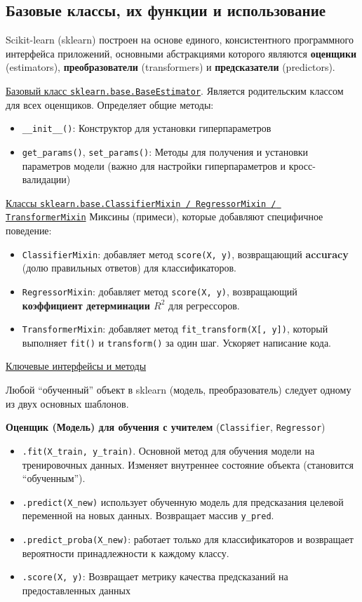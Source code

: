 \subsection{Базовые классы, их функции и использование}

Scikit-learn (sklearn) построен на основе единого, консистентного программного интерфейса приложений, основными
абстракциями которого являются \textbf{оценщики} (estimators), \textbf{преобразователи} (transformers) и
\textbf{предсказатели} (predictors).

\underline{Базовый класс \texttt{sklearn.base.BaseEstimator}}.
Является родительским классом для всех оценщиков.
Определяет общие методы:
\begin{itemize}
    \item \texttt{\_\_init\_\_()}: Конструктор для установки гиперпараметров
    \item \texttt{get\_params()}, \texttt{set\_params()}: Методы для получения и установки параметров модели
    (важно для настройки гиперпараметров и кросс-валидации)
\end{itemize}

\underline{Классы \texttt{sklearn.base.ClassifierMixin / RegressorMixin / TransformerMixin}}
Миксины (примеси), которые добавляют специфичное поведение:
\begin{itemize}
    \item \texttt{ClassifierMixin}: добавляет метод \texttt{score(X, y)}, возвращающий
    \textbf{accuracy} (долю правильных ответов) для классификаторов.
    \item \texttt{RegressorMixin}: добавляет метод \texttt{score(X, y)}, возвращающий
    \textbf{коэффициент детерминации $R^2$} для регрессоров.
    \item \texttt{TransformerMixin}: добавляет метод \texttt{fit\_transform(X[, y])}, который выполняет
    \texttt{fit()} и \texttt{transform()} за один шаг.
    Ускоряет написание кода.
\end{itemize}

\underline{Ключевые интерфейсы и методы}

Любой ``обученный'' объект в sklearn (модель, преобразователь) следует одному из двух основных шаблонов.

\textbf{Оценщик (Модель) для обучения с учителем} (\texttt{Classifier}, \texttt{Regressor})
\begin{itemize}
    \item \texttt{.fit(X\_train, y\_train)}.
    Основной метод для обучения модели на тренировочных данных.
    Изменяет внутреннее состояние объекта (становится ``обученным'').
    \item \texttt{.predict(X\_new)} использует обученную модель для предсказания целевой переменной на новых
    данных.
    Возвращает массив \texttt{y\_pred}.
    \item \texttt{.predict\_proba(X\_new)}: работает только для классификаторов и возвращает вероятности
    принадлежности к каждому классу.
    \item \texttt{.score(X, y)}: Возвращает метрику качества предсказаний на предоставленных данных
\end{itemize}

